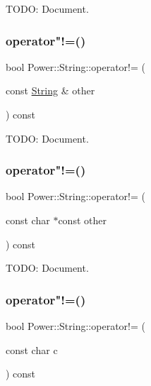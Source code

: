 T\+O\+DO\+: Document. 

\mbox{\label{class_power_1_1_string_a554a6ff1a319237b53d978ed3ef18f07}} 
\subsubsection{\texorpdfstring{operator"!=()}{operator!=()}\hspace{0.1cm}{\footnotesize\ttfamily [1/3]}}
{\footnotesize\ttfamily bool Power\+::\+String\+::operator!= (\begin{DoxyParamCaption}\item[{const \hyperlink{class_power_1_1_string}{String} \&}]{other }\end{DoxyParamCaption}) const\hspace{0.3cm}{\ttfamily [inline]}}



T\+O\+DO\+: Document. 

\mbox{\label{class_power_1_1_string_a267b8f261bcafb9ec6d86cfe12494c94}} 
\subsubsection{\texorpdfstring{operator"!=()}{operator!=()}\hspace{0.1cm}{\footnotesize\ttfamily [2/3]}}
{\footnotesize\ttfamily bool Power\+::\+String\+::operator!= (\begin{DoxyParamCaption}\item[{const char $\ast$const}]{other }\end{DoxyParamCaption}) const\hspace{0.3cm}{\ttfamily [inline]}}



T\+O\+DO\+: Document. 

\mbox{\label{class_power_1_1_string_a3216ffa5d292b08997d1c93d3c33251e}} 
\subsubsection{\texorpdfstring{operator"!=()}{operator!=()}\hspace{0.1cm}{\footnotesize\ttfamily [3/3]}}
{\footnotesize\ttfamily bool Power\+::\+String\+::operator!= (\begin{DoxyParamCaption}\item[{const char}]{c }\end{DoxyParamCaption}) const\hspace{0.3cm}{\ttfamily [inline]}}



